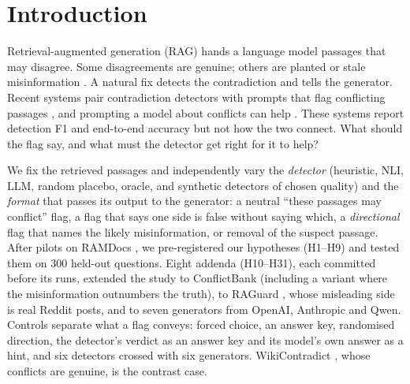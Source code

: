 \section{Introduction}

Retrieval-augmented generation (RAG) \citep{lewis2020rag} hands a language model passages that may disagree. Some
disagreements are genuine; others are planted or stale misinformation \citep{zou2025poisonedrag,wang2025madam}. A natural fix detects the contradiction and tells
the generator. Recent systems pair contradiction detectors with prompts that flag conflicting passages
\citep{wang2026conflictrag}, and prompting a model about conflicts can help \citep{cattan2025conflicts}. These systems
report detection F1 and end-to-end accuracy but not how the two connect. What should the flag say, and what must the
detector get right for it to help?

We fix the retrieved passages and independently vary the \emph{detector} (heuristic, NLI, LLM, random placebo,
oracle, and synthetic detectors of chosen quality) and the \emph{format} that passes its output to the generator: a
neutral ``these passages may conflict'' flag, a flag that says one side is false without saying which, a
\emph{directional} flag that names the likely misinformation, or removal of the suspect passage. After pilots on
RAMDocs \citep{wang2025madam}, we pre-registered our hypotheses (H1--H9) and tested them on 300 held-out questions.
Eight addenda (H10--H31), each committed before its runs, extended the study to ConflictBank \citep{su2024conflictbank}
(including a variant where the misinformation outnumbers the truth), to RAGuard \citep{zeng2025raguard}, whose
misleading side is real Reddit posts, and to seven generators from OpenAI, Anthropic and Qwen. Controls separate what a
flag conveys: forced choice, an answer key, randomised direction, the detector's verdict as an answer key and its model's own answer as
a hint, and six detectors crossed with six generators. WikiContradict \citep{hou2024wikicontradict}, whose conflicts are genuine, is the contrast case.

